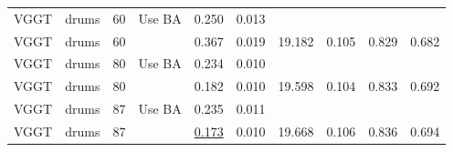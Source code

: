 \begin{table}[H]
\begin{tabular}{llrlrrrrrr}
VGGT & drums & 60 & Use BA & 0.250 & 0.013 &  &  &  &  \\
VGGT & drums & 60 &  & 0.367 & 0.019 & 19.182 & 0.105 & 0.829 & 0.682 \\
VGGT & drums & 80 & Use BA & 0.234 & 0.010 &  &  &  &  \\
VGGT & drums & 80 &  & 0.182 & 0.010 & 19.598 & 0.104 & 0.833 & 0.692 \\
VGGT & drums & 87 & Use BA & 0.235 & 0.011 &  &  &  &  \\
VGGT & drums & 87 &  & \underline{0.173} & 0.010 & 19.668 & 0.106 & 0.836 & 0.694 \\
\bottomrule
\end{tabular}
\end{table}
